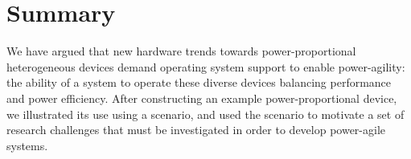 \section{Summary}

We have argued that new hardware trends towards power-proportional
heterogeneous devices demand operating system support to enable
power-agility: the ability of a system to operate these diverse devices
balancing performance and power efficiency. After constructing an example
power-proportional device, we illustrated its use using a scenario, and used
the scenario to motivate a set of research challenges that must be
investigated in order to develop power-agile systems.
